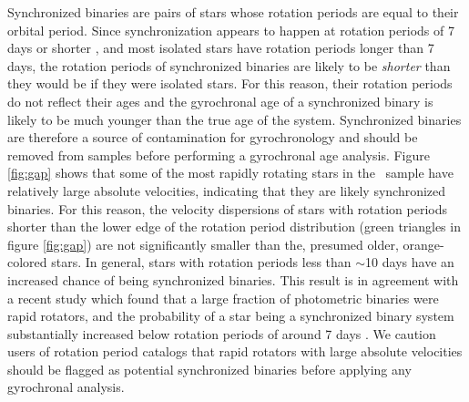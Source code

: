 Synchronized binaries are pairs of stars whose rotation periods are equal to
their orbital period.
Since synchronization appears to happen at rotation periods of 7 days or
shorter \citep{simonian2019}, and most isolated stars have rotation periods
longer than 7 days, the rotation periods of synchronized binaries are likely
to be {\it shorter} than they would be if they were isolated stars.
For this reason, their rotation periods do not reflect their ages and the
gyrochronal age of a synchronized binary is likely to be much younger than the
true age of the system.
Synchronized binaries are therefore a source of contamination for
gyrochronology and should be removed from samples before performing a
gyrochronal age analysis.
Figure \ref{fig:gap} shows that some of the most rapidly rotating stars in the
\mct\ sample have relatively large absolute velocities, indicating that they
are likely synchronized binaries.
For this reason, the velocity dispersions of stars with rotation periods
shorter than the lower edge of the rotation period distribution (green
triangles in figure \ref{fig:gap}) are not significantly smaller than the,
presumed older, orange-colored stars.
In general, stars with rotation periods less than $\sim$10 days have an
increased chance of being synchronized binaries.
This result is in agreement with a recent study which found that a large
fraction of photometric binaries were rapid rotators, and the probability of a
star being a synchronized binary system substantially increased below rotation
periods of around 7 days \citep{simonian2019}.
We caution users of rotation period catalogs that rapid rotators with large
absolute velocities should be flagged as potential synchronized binaries
before applying any gyrochronal analysis.



